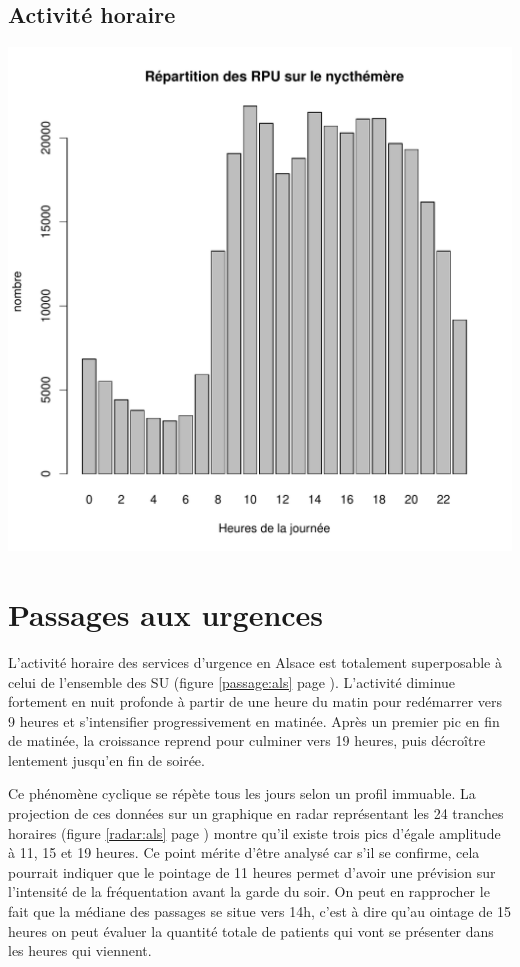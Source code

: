\documentclass[12pt,english,french,twoside]{report}\usepackage[]{graphicx}\usepackage[]{color}
\makeatletter
\def\maxwidth{ %
  \ifdim\Gin@nat@width>\linewidth
    \linewidth
  \else
    \Gin@nat@width
  \fi
}
\newenvironment{knitrout}{}{} %
\makeatother
\begin{document}
\subsection*{Activité horaire}
\begin{knitrout}
\color{fgcolor}
\includegraphics[width=\maxwidth]{figure/activite_heure} 

\end{knitrout}


  


\section{Passages aux urgences}


L'activité horaire des services d'urgence en Alsace est totalement superposable à celui de l'ensemble des SU (figure \ref{passage:als} page \pageref{passage:als}). L'activité diminue fortement en nuit profonde à partir de une heure du matin pour redémarrer vers 9 heures et s'intensifier progressivement en matinée. Après un premier pic en fin de matinée, la croissance reprend pour culminer vers 19 heures, puis décroître lentement jusqu'en fin de soirée.

Ce phénomène cyclique se répète tous les jours selon un profil immuable. La projection de ces données sur un graphique en radar représentant les 24 tranches horaires (figure \ref{radar:als} page \pageref{radar:als}) montre qu'il existe trois pics d'égale amplitude à 11, 15 et 19 heures. Ce point mérite d'être analysé car s'il se confirme, cela pourrait indiquer que le pointage de 11 heures permet d'avoir une prévision sur l'intensité de la fréquentation avant la garde du soir. On peut en rapprocher le fait que la médiane des passages se situe vers 14h, c'est à dire qu'au ointage de 15 heures on peut évaluer la quantité totale de patients qui vont se présenter dans les heures qui viennent.
\end{document}
